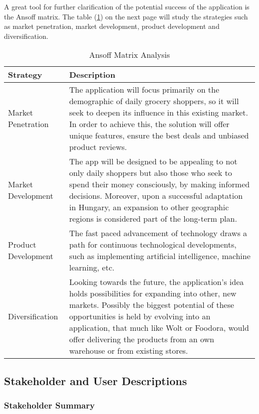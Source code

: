 A great tool for further clarification of the potential success of the application is the Ansoff matrix. The table (\ref{tab:ansoff}) on the next page will study the strategies such as market penetration, market development, product development and diversification.

\begin{table}[h]
	\centering
	\begin{tabularx}{\textwidth}{|p{3.7cm}|X|}
		\hline
		\textbf{Strategy} & \textbf{Description} \\
		\hline
		Market Penetration & The application will focus primarily on the demographic of daily grocery shoppers, so it will seek to deepen its influence in this existing market. In order to achieve this, the solution will offer unique features, ensure the best deals and unbiased product reviews. \\
		\hline
		Market Development & The app will be designed to be appealing to not only daily shoppers but also those who seek to spend their money consciously, by making informed decisions. Moreover, upon a successful adaptation in Hungary, an expansion to other geographic regions is considered part of the long-term plan. \\
		\hline
		Product Development & The fast paced advancement of technology draws a path for continuous technological developments, such as implementing artificial intelligence, machine learning, etc.\\
		\hline
		Diversification & Looking towards the future, the application's idea holds possibilities for expanding into other, new markets. Possibly the biggest potential of these opportunities is held by evolving into an application, that much like Wolt or Foodora, would offer delivering the products from an own warehouse or from existing stores. \\
		\hline
	\end{tabularx}
	\caption{Ansoff Matrix Analysis}
	\label{tab:ansoff}
\end{table}


\pagebreak

\subsection{Stakeholder and User Descriptions}

\subsubsection{Stakeholder Summary}

